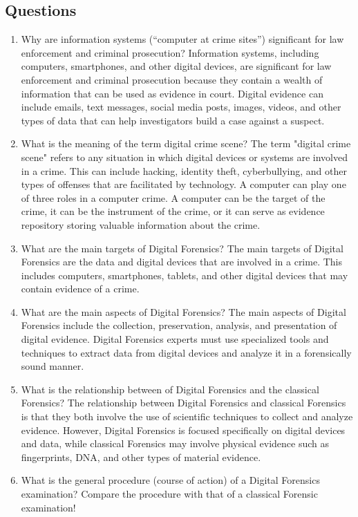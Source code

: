 \documentclass{scrreprt}
\begin{document}
\subsection{Questions}
\begin{enumerate}
\item  Why are information systems (“computer at crime sites”) significant for law enforcement and criminal prosecution? 
Information systems, including computers, smartphones, and other digital devices, are significant for law enforcement and criminal prosecution because they contain a wealth of information that can be used as evidence in court. Digital evidence can include emails, text messages, social media posts, images, videos, and other types of data that can help investigators build a case against a suspect.
\item What is the meaning of the term digital crime scene? 
The term "digital crime scene" refers to any situation in which digital devices or systems are involved in a crime. This can include hacking, identity theft, cyberbullying, and other types of offenses that are facilitated by technology. A computer can play one of three roles in a computer crime. A computer can be the target of the crime, it can be the instrument of the crime, or it can serve as evidence repository storing valuable information about the crime.
\item What are the main targets of Digital Forensics? 
The main targets of Digital Forensics are the data and digital devices that are involved in a crime. This includes computers, smartphones, tablets, and other digital devices that may contain evidence of a crime.
\item What are the main aspects of Digital Forensics? 
The main aspects of Digital Forensics include the collection, preservation, analysis, and presentation of digital evidence. Digital Forensics experts must use specialized tools and techniques to extract data from digital devices and analyze it in a forensically sound manner.
\item What is the relationship between of Digital Forensics and the classical Forensics? 
The relationship between Digital Forensics and classical Forensics is that they both involve the use of scientific techniques to collect and analyze evidence. However, Digital Forensics is focused specifically on digital devices and data, while classical Forensics may involve physical evidence such as fingerprints, DNA, and other types of material evidence.
\item What is the general procedure (course of action) of a Digital Forensics examination? Compare the procedure with that of a classical Forensic examination! 

\end{enumerate}
\end{document}
